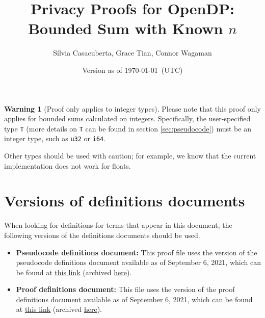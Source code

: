 \documentclass[11pt,a4paper]{article}
\title{Privacy Proofs for OpenDP: Bounded Sum with Known $n$}
\author{S\'ilvia Casacuberta, Grace Tian, Connor Wagaman}
\date{Version as of \today~(UTC)}
\theoremstyle{definition}
\newtheorem{warning}{Warning}
\begin{document}
\maketitle

\tableofcontents

\bigskip

\begin{tcolorbox}
\begin{warning}[Proof only applies to integer types]
Please note that this proof only applies for bounded sums calculated on integers. Specifically, the user-specified type \texttt{T} (more details on \texttt{T} can be found in section \ref{sec:pseudocode}) must be an integer type, such as \texttt{u32} or \texttt{i64}.

Other types should be used with caution; for example, we know that the current implementation does not work for floats.
\end{warning}
\end{tcolorbox}

\section{Versions of definitions documents}
\label{sec:versioned-docs}

When looking for definitions for terms that appear in this document, the following versions of the definitions documents should be used.

\begin{itemize}
    \item \textbf{Pseudocode definitions document:} This proof file uses the version of the pseudocode definitions document available as of September 6, 2021, which can be found at \href{https://github.com/opendp/whitepapers/blob/f8b279ab249934182f306138fa14e6390ddae3e9/pseudocode-defns/pseudocode_defns.pdf}{this link} (archived \href{https://web.archive.org/web/20210906201546/https://raw.githubusercontent.com/opendp/whitepapers/pseudocode-defns/pseudocode-defns/pseudocode_defns.pdf}{here}).
    
    \item \textbf{Proof definitions document:} This file uses the version of the proof definitions document available as of September 6, 2021, which can be found at \href{https://github.com/opendp/whitepapers/blob/d4c24e55cc37878634fec0b7f5c89259a3ad3ded/proof-defns/proof_defns.pdf}{this link} (archived \href{https://web.archive.org/web/20210906201056/https://raw.githubusercontent.com/opendp/whitepapers/proof-defns/proof-defns/proof_defns.pdf}{here}). 
\end{itemize}
\end{document}
